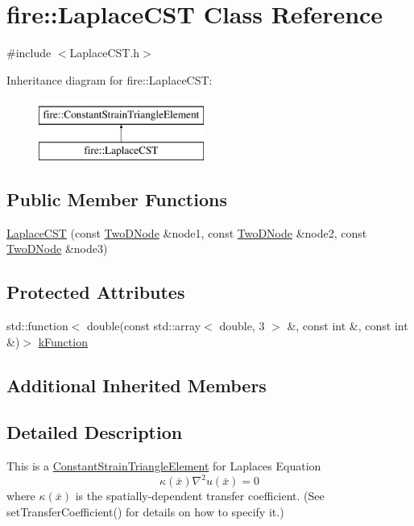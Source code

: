 \hypertarget{a00809}{}\section{fire\+:\+:Laplace\+C\+ST Class Reference}
\label{a00809}


{\ttfamily \#include $<$Laplace\+C\+S\+T.\+h$>$}

Inheritance diagram for fire\+:\+:Laplace\+C\+ST\+:\begin{figure}[H]
\begin{center}
\leavevmode
\includegraphics[height=2.000000cm]{a00809}
\end{center}
\end{figure}
\subsection*{Public Member Functions}
\begin{DoxyCompactItemize}
\item 
\hyperlink{a00809_a6be98b3a124e32f9f9e35864e1a032de}{Laplace\+C\+ST} (const \hyperlink{a00210_a92dafcc05a788e1065a5792b67f0f70e}{Two\+D\+Node} \&node1, const \hyperlink{a00210_a92dafcc05a788e1065a5792b67f0f70e}{Two\+D\+Node} \&node2, const \hyperlink{a00210_a92dafcc05a788e1065a5792b67f0f70e}{Two\+D\+Node} \&node3)
\end{DoxyCompactItemize}
\subsection*{Protected Attributes}
\begin{DoxyCompactItemize}
\item 
std\+::function$<$ double(const std\+::array$<$ double, 3 $>$ \&, const int \&, const int \&)$>$ \hyperlink{a00809_a29219b378306be30e3577c0508098ca7}{k\+Function}
\end{DoxyCompactItemize}
\subsection*{Additional Inherited Members}


\subsection{Detailed Description}
This is a \hyperlink{a00789}{Constant\+Strain\+Triangle\+Element} for Laplace\textquotesingle{}s Equation \[ \kappa(\bar{x})\nabla^{2}u(\bar{x}) = 0 \] where $\kappa(\bar{x})$ is the spatially-\/dependent transfer coefficient. (See set\+Transfer\+Coefficient() for details on how to specify it.)

